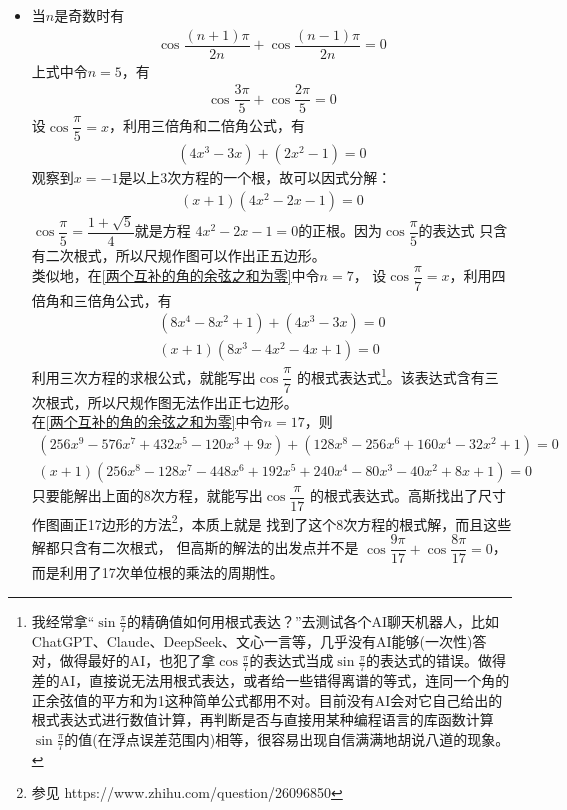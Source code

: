 \begin{itemize}[leftmargin=\inteval{\myitemleftmargin}pt,itemsep=
   \inteval{\myitemitempsep}pt,topsep=\inteval{\myitemtopsep}pt]
\item 当$ n $是奇数时有
\begin{gather}\label{两个互补的角的余弦之和为零}
    \cos\dfrac{(n+1)\pi}{2n}+\cos\dfrac{(n-1)\pi}{2n}=0
\end{gather}
上式中令$ n=5 $，有
\begin{gather*}
    \cos\dfrac{3\pi}{5}+\cos\dfrac{2\pi}{5}=0
\end{gather*}
设$ \cos\dfrac{\pi}{5}=x $，利用三倍角和二倍角公式，有
\begin{gather*}
    (4x^3-3x)+(2x^2-1)=0
\end{gather*}
观察到$ x=-1 $是以上3次方程的一个根，故可以因式分解：
\begin{gather*}
    (x+1)(4x^2-2x-1)=0
\end{gather*}
$ \cos\dfrac{\pi}{5}=\dfrac{1+\sqrt{5}}{4} $就是方程
$ 4 x^2-2x-1=0 $的正根。因为$ \cos\dfrac{\pi}{5} $的表达式
只含有二次根式，所以尺规作图可以作出正五边形。\\
类似地，在\eqref{两个互补的角的余弦之和为零}中令$ n=7 $，
设$ \cos\dfrac{\pi}{7}=x $，利用四倍角和三倍角公式，有
\begin{gather*}
    (8x^4-8x^2+1)+(4x^3-3x)=0 \\
    (x+1)(8x^3-4x^2-4x+1)=0
\end{gather*}
利用三次方程的求根公式，就能写出$ \cos\dfrac{\pi}{7} $
的根式表达式\footnote{我经常拿“$ \sin\frac{\pi}{7} $的精确值如何用根式表达？”去测试各个AI聊天机器人，比如ChatGPT、Claude、DeepSeek、文心一言等，几乎没有AI能够(一次性)答对，做得最好的AI，也犯了拿$ \cos\frac{\pi}{7} $的表达式当成$ \sin\frac{\pi}{7} $的表达式的错误。做得差的AI，直接说无法用根式表达，或者给一些错得离谱的等式，连同一个角的正余弦值的平方和为1这种简单公式都用不对。目前没有AI会对它自己给出的根式表达式进行数值计算，再判断是否与直接用某种编程语言的库函数计算$ \sin\frac{\pi}{7} $的值(在浮点误差范围内)相等，很容易出现自信满满地胡说八道的现象。}。该表达式含有三次根式，所以尺规作图无法作出正七边形。\\
在\eqref{两个互补的角的余弦之和为零}中令$ n=17 $，则
\begin{gather*}
    (256x^9-576x^7+432x^5-120x^3+9x)+(128x^8-256x^6+160x^4-32x^2+1)=0\\
    (x+1)(256x^8-128x^7-448x^6+192x^5+240x^4-80x^3-40x^2+8x+1)=0
\end{gather*}
只要能解出上面的8次方程，就能写出$ \cos\dfrac{\pi}{17} $
的根式表达式。高斯找出了尺寸作图画正17边形的方法\footnote{参见
    https://www.zhihu.com/question/26096850}，本质上就是
找到了这个8次方程的根式解，而且这些解都只含有二次根式，
但高斯的解法的出发点并不是
$ \cos\dfrac{9\pi}{17}+\cos\dfrac{8\pi}{17}=0 $，
而是利用了17次单位根的乘法的周期性。


\end{itemize}
